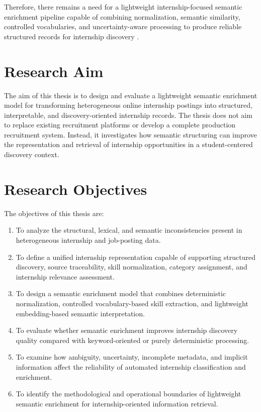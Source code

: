 Therefore, there remains a need for a lightweight internship-focused semantic enrichment pipeline capable of combining normalization, semantic similarity, controlled vocabularies, and uncertainty-aware processing to produce reliable structured records for internship discovery \cite{batini2009methodologies, menghani2023efficient}.

\section{Research Aim}
The aim of this thesis is to design and evaluate a lightweight semantic enrichment model for
transforming heterogeneous online internship postings into structured, interpretable, and
discovery-oriented internship records.
The thesis does not aim to replace existing recruitment platforms or develop a complete
production recruitment system. Instead, it investigates how semantic structuring can improve the
representation and retrieval of internship opportunities in a student-centered discovery context.


\section{Research Objectives}
The objectives of this thesis are:

\begin{enumerate}[label=\textbf{\arabic*:}, start=1, leftmargin=2.2cm]
    \item To analyze the structural, lexical, and semantic inconsistencies present in heterogeneous internship and job-posting data.
    \item To define a unified internship representation capable of supporting structured discovery, source traceability, skill normalization, category assignment, and internship relevance assessment.
    \item To design a semantic enrichment model that combines deterministic normalization, controlled vocabulary-based skill extraction, and lightweight embedding-based semantic interpretation.
    \item To evaluate whether semantic enrichment improves internship discovery quality compared with keyword-oriented or purely deterministic processing.
    \item To examine how ambiguity, uncertainty, incomplete metadata, and implicit information affect the reliability of automated internship classification and enrichment.
    \item To identify the methodological and operational boundaries of lightweight semantic enrichment for internship-oriented information retrieval.
\end{enumerate}
